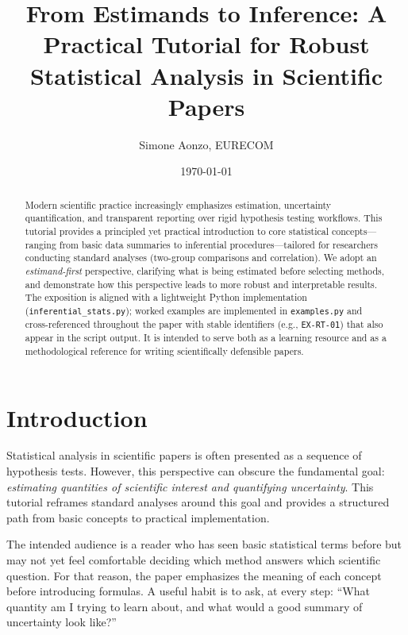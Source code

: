 \documentclass[11pt]{article}
\title{From Estimands to Inference: A Practical Tutorial for Robust Statistical Analysis in Scientific Papers}
\author{Simone Aonzo, EURECOM}
\date{\today}
\begin{document}
\maketitle

\begin{abstract}
Modern scientific practice increasingly emphasizes estimation, uncertainty quantification, and transparent reporting over rigid hypothesis testing workflows. This tutorial provides a principled yet practical introduction to core statistical concepts—ranging from basic data summaries to inferential procedures—tailored for researchers conducting standard analyses (two-group comparisons and correlation). We adopt an \emph{estimand-first} perspective, clarifying what is being estimated before selecting methods, and demonstrate how this perspective leads to more robust and interpretable results. The exposition is aligned with a lightweight Python implementation (\verb|inferential_stats.py|); worked examples are implemented in \verb|examples.py| and cross-referenced throughout the paper with stable identifiers (e.g., \verb|EX-RT-01|) that also appear in the script output. It is intended to serve both as a learning resource and as a methodological reference for writing scientifically defensible papers.
\end{abstract}

\tableofcontents

\section{Introduction}

Statistical analysis in scientific papers is often presented as a sequence of hypothesis tests. However, this perspective can obscure the fundamental goal: \emph{estimating quantities of scientific interest and quantifying uncertainty}. This tutorial reframes standard analyses around this goal and provides a structured path from basic concepts to practical implementation.

The intended audience is a reader who has seen basic statistical terms before but may not yet feel comfortable deciding which method answers which scientific question. For that reason, the paper emphasizes the meaning of each concept before introducing formulas. A useful habit is to ask, at every step: ``What quantity am I trying to learn about, and what would a good summary of uncertainty look like?''
\end{document}
